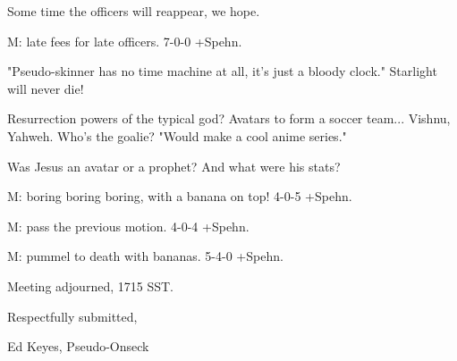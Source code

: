 \documentclass[12pt]{article}
\begin{document}
Some time the officers will reappear, we hope.

M: late fees for late officers. 7-0-0 +Spehn.

"Pseudo-skinner has no time machine at all, it's just a bloody clock." Starlight will never die!

Resurrection powers of the typical god? Avatars to form a soccer team... Vishnu, Yahweh. Who's the goalie? "Would make a cool anime series."

Was Jesus an avatar or a prophet? And what were his stats?

M: boring boring boring, with a banana on top! 4-0-5 +Spehn.

M: pass the previous motion. 4-0-4 +Spehn.

M: pummel to death with bananas. 5-4-0 +Spehn.

\vspace{12pt}

\noindent
Meeting adjourned, 1715 SST.

\vspace{18pt}

\centerline{Respectfully submitted,}
\centerline{Ed Keyes, Pseudo-Onseck}
\end{document}
